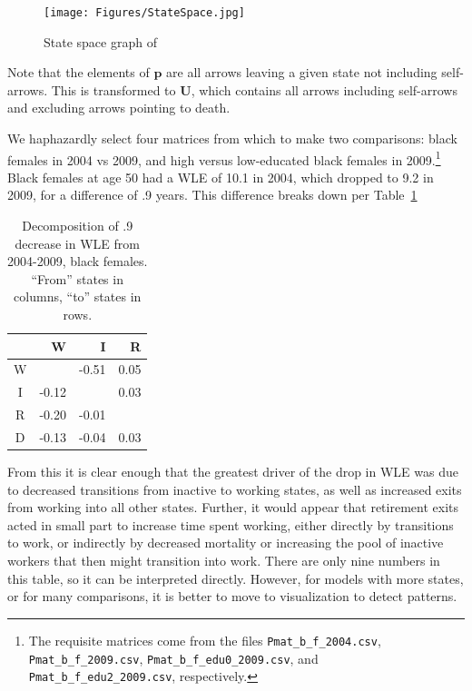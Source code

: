 \documentclass{article}
\begin{document}
\begin{figure}[ht!]
\begin{center}
\caption{State space graph of \citet{Dudel2017}}
\label{fig:dudelstates}
\texttt{[image: Figures/StateSpace.jpg]}
\end{center}
\end{figure}

Note that the elements of $\textbf{p}$ are all arrows leaving a given state not
including self-arrows. This is transformed to $\textbf{U}$, which contains all
arrows including self-arrows and excluding arrows pointing to death. 

We haphazardly select four matrices from which to make two comparisons: black
females in 2004 vs 2009, and high versus low-educated black females in
2009.\footnote{The requisite matrices come from the files
\texttt{Pmat\_b\_f\_2004.csv}, \texttt{Pmat\_b\_f\_2009.csv}, \texttt{Pmat\_b\_f\_edu0\_2009.csv}, and
\texttt{Pmat\_b\_f\_edu2\_2009.csv}, respectively. } Black females at age 50 had
a WLE of 10.1 in 2004, which dropped to 9.2 in 2009, for a difference of .9
years. This difference breaks down per Table~\ref{tab:A}
\FloatBarrier
\begin{table}[ht]
\centering
\caption{Decomposition of .9 decrease in WLE from 2004-2009, black females.
``From'' states in columns, ``to'' states in rows.}
\label{tab:A}
\begin{tabular}{c|rrr}
 & W & I & R \\ 
  \hline
W &  & -0.51 & 0.05 \\ 
  I & -0.12 &  & 0.03 \\ 
  R & -0.20 & -0.01 &  \\ 
  D & -0.13 & -0.04 & 0.03 \\ 
   \hline
\end{tabular}
\end{table}

From this it is clear enough that the greatest driver of the drop in WLE was due
to decreased transitions from inactive to working states, as well as increased
exits from working into all other states. Further, it would appear that
retirement exits acted in small part to increase time spent working, either
directly by transitions to work, or indirectly by decreased mortality or increasing the pool
of inactive workers that then might transition into work. There are only nine
numbers in this table, so it can be interpreted directly. However, for models
with more states, or for many comparisons, it is better to move to visualization
to detect patterns. 
\end{document}
